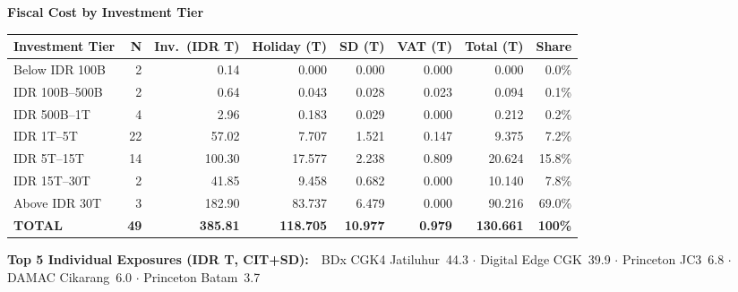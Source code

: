 \documentclass[aspectratio=169,10pt]{beamer}
\begin{document}
\begin{frame}{\textbf{Fiscal Cost by Investment Tier}}
\vspace{0.1cm}
\centering
{\scriptsize
\begin{tabular}{lrrrrrrr}
\toprule
\rowcolor{navyblue}
\color{white}\textbf{Investment Tier} &
\color{white}\textbf{N} &
\color{white}\textbf{Inv.\ (IDR T)} &
\color{white}\textbf{Holiday (T)} &
\color{white}\textbf{SD (T)} &
\color{white}\textbf{VAT (T)} &
\color{white}\textbf{Total (T)} &
\color{white}\textbf{Share} \\
\midrule
\rowcolor{lightgray}
Below IDR 100B    & 2  &   0.14 &   0.000 &  0.000 &  0.000 &   0.000 &  0.0\% \\
IDR 100B–500B     & 2  &   0.64 &   0.043 &  0.028 &  0.023 &   0.094 &  0.1\% \\
\rowcolor{lightgray}
IDR 500B–1T       & 4  &   2.96 &   0.183 &  0.029 &  0.000 &   0.212 &  0.2\% \\
IDR 1T–5T         & 22 &  57.02 &   7.707 &  1.521 &  0.147 &   9.375 &  7.2\% \\
\rowcolor{lightgray}
IDR 5T–15T        & 14 & 100.30 &  17.577 &  2.238 &  0.809 &  20.624 & 15.8\% \\
IDR 15T–30T       & 2  &  41.85 &   9.458 &  0.682 &  0.000 &  10.140 &  7.8\% \\
\rowcolor{lightgray}
Above IDR 30T     & 3  & 182.90 &  83.737 &  6.479 &  0.000 &  90.216 & 69.0\% \\
\midrule
\rowcolor{navyblue}
\color{white}\textbf{TOTAL} &
\color{white}\textbf{49} &
\color{white}\textbf{385.81} &
\color{white}\textbf{118.705} &
\color{white}\textbf{10.977} &
\color{white}\textbf{0.979} &
\color{white}\textbf{130.661} &
\color{white}\textbf{100\%} \\
\bottomrule
\end{tabular}
}

\vspace{0.3cm}
{\scriptsize\textbf{Top 5 Individual Exposures (IDR T, CIT+SD):}\ \
BDx CGK4 Jatiluhur~44.3 $\cdot$ Digital Edge CGK~39.9 $\cdot$ Princeton JC3~6.8 $\cdot$ DAMAC Cikarang~6.0 $\cdot$ Princeton Batam~3.7}
\end{frame}
\end{document}
